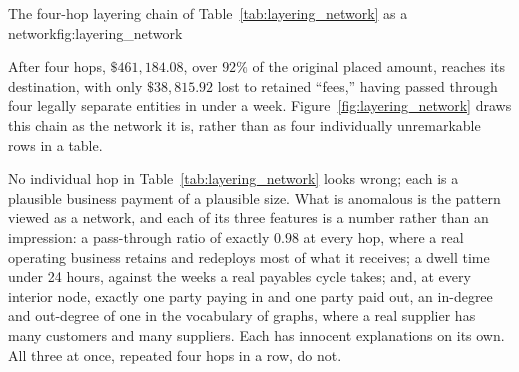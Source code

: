 \documentclass[../ai_in_finance]{subfiles}
\begin{document}
\begin{bookfigure}[htbp]{The four-hop layering chain of Table~\ref{tab:layering_network} as a network}{fig:layering_network}
\end{bookfigure}

After four hops, $\$461{,}184.08$, over $92\%$ of the original placed amount, reaches its destination, with only $\$38{,}815.92$ lost to retained ``fees,'' having passed through four legally separate entities in under a week. Figure~\ref{fig:layering_network} draws this chain as the network it is, rather than as four individually unremarkable rows in a table.

No individual hop in Table~\ref{tab:layering_network} looks wrong; each is a plausible business payment of a plausible size. What is anomalous is the pattern viewed as a network, and each of its three features is a number rather than an impression: a pass-through ratio of exactly $0.98$ at every hop, where a real operating business retains and redeploys most of what it receives; a dwell time under 24 hours, against the weeks a real payables cycle takes; and, at every interior node, exactly one party paying in and one party paid out, an in-degree and out-degree of one in the vocabulary of graphs, where a real supplier has many customers and many suppliers. Each has innocent explanations on its own. All three at once, repeated four hops in a row, do not.
\end{document}
